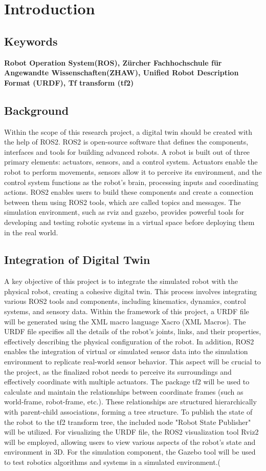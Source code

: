 \chapter{Introduction}
\section*{Keywords}
\textbf{Robot Operation System(ROS), Zürcher Fachhochschule für Angewandte Wissenschaften(ZHAW), Unified Robot Description Format (URDF), Tf transform (tf2)}
\section{Background}
Within the scope of this research project, a digital twin should be created with the help of ROS2. ROS2 is open-source software that defines the components, interfaces and tools for building advanced robots. A robot is built out of three primary elements: actuators, sensors, and a control system. Actuators enable the robot to perform movements, sensors allow it to perceive its environment, and the control system functions as the robot's brain, processing inputs and coordinating actions.
ROS2 enables users to build these components and create a connection between them using ROS2 tools, which are called topics and messages. The simulation environment, such as rviz and gazebo, provides powerful tools for developing and testing robotic systems in a virtual space before deploying them in the real world.
\autocite{ROSHome}

\section{Integration of Digital Twin}
A key objective of this project is to integrate the simulated robot with the physical robot, creating a cohesive digital twin. This process involves integrating various ROS2 tools and components, including kinematics, dynamics, control systems, and sensory data. Within the framework of this project, a URDF file will be generated using the XML macro language Xacro (XML Macros). The URDF file specifies all the details of the robot's joints, links, and their properties, effectively describing the physical configuration of the robot.
In addition, ROS2 enables the integration of virtual or simulated sensor data into the simulation environment to replicate real-world sensor behavior. This aspect will be crucial to the project, as the finalized robot needs to perceive its surroundings and effectively coordinate with multiple actuators.
The package tf2 will be used to calculate and maintain the relationships between coordinate frames (such as world-frame, robot-frame, etc.). These relationships are structured hierarchically with parent-child associations, forming a tree structure. To publish the state of the robot to the tf2 transform tree, the included node "Robot State Publisher" will be utilized. For visualizing the URDF file, the ROS2 visualization tool Rviz2 will be employed, allowing users to view various aspects of the robot's state and environment in 3D. For the simulation component, the Gazebo tool will be used to test robotics algorithms and systems in a simulated environment.(
\autocite{ROS2Part122024}

